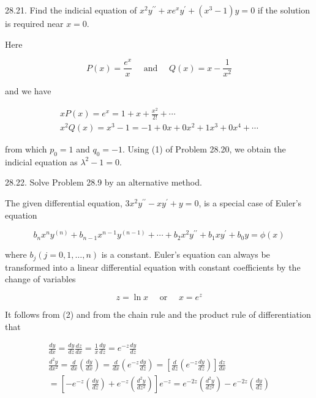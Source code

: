 \documentclass[10pt]{article}
\begin{document}
28.21. Find the indicial equation of $x^{2} y^{\prime \prime}+x e^{x} y^{\prime}+\left(x^{3}-1\right) y=0$ if the solution is required near $x=0$.

Here

$$
P(x)=\frac{e^{x}}{x} \quad \text { and } \quad Q(x)=x-\frac{1}{x^{2}}
$$

and we have

$$
\begin{gathered}
x P(x)=e^{x}=1+x+\frac{x^{2}}{2 !}+\cdots \\
x^{2} Q(x)=x^{3}-1=-1+0 x+0 x^{2}+1 x^{3}+0 x^{4}+\cdots
\end{gathered}
$$

from which $p_{0}=1$ and $q_{0}=-1$. Using (1) of Problem 28.20, we obtain the indicial equation as $\lambda^{2}-1=0$.

28.22. Solve Problem 28.9 by an alternative method.

The given differential equation, $3 x^{2} y^{\prime \prime}-x y^{\prime}+y=0$, is a special case of Euler's equation


\begin{equation*}
b_{n} x^{n} y^{(n)}+b_{n-1} x^{n-1} y^{(n-1)}+\cdots+b_{2} x^{2} y^{\prime \prime}+b_{1} x y^{\prime}+b_{0} y=\phi(x) \tag{1}
\end{equation*}


where $b_{j}(j=0,1, \ldots, n)$ is a constant. Euler's equation can always be transformed into a linear differential equation with constant coefficients by the change of variables


\begin{equation*}
z=\ln x \quad \text { or } \quad x=e^{z} \tag{2}
\end{equation*}


It follows from (2) and from the chain rule and the product rule of differentiation that


\begin{gather*}
\frac{d y}{d x}=\frac{d y}{d z} \frac{d z}{d x}=\frac{1}{x} \frac{d y}{d z}=e^{-z} \frac{d y}{d z}  \tag{3}\\
\frac{d^{2} y}{d x^{2}}=\frac{d}{d x}\left(\frac{d y}{d x}\right)=\frac{d}{d x}\left(e^{-z} \frac{d y}{d z}\right)=\left[\frac{d}{d z}\left(e^{-z} \frac{d y}{d z}\right)\right] \frac{d z}{d x} \\
=\left[-e^{-z}\left(\frac{d y}{d z}\right)+e^{-z}\left(\frac{d^{2} y}{d z^{2}}\right)\right] e^{-z}=e^{-2 z}\left(\frac{d^{2} y}{d z^{2}}\right)-e^{-2 z}\left(\frac{d y}{d z}\right) \tag{4}
\end{gather*}
\end{document}
